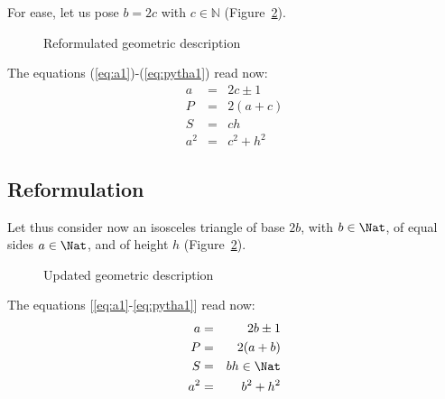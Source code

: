 \documentclass[11pt, twoside, a4paper]{article}
\newcommand{\Figure}[1]{Figure~\ref{#1}}
\newcommand{\set}[1]{\mathbb{#1}}
\begin{document}
For ease, let us pose $b=2c$ with $c\in\set N$ (\Figure{fig:triangle2}). 
\begin{figure}
    \begin{center}
        \caption{Reformulated geometric description}
        \label{fig:triangle2}
    \end{center}
\end{figure}

The equations (\ref{eq:a1})-(\ref{eq:pytha1}) read now:
\begin{eqnarray}
a & = & 2c \pm 1 \\
P & = & 2(a+c) \\ 
S & = & ch \\
a^2 & = & c^2 + h^2 
\end{eqnarray}

    \subsection{Reformulation}
    Let thus consider now an isosceles triangle of base $2b$, with $b\in\Nat$, of equal sides $a\in\Nat$, and of height $h$ (\Figure{fig:triangle2}).
    
    \begin{figure}[h!]
        \begin{center}
            \caption{Updated geometric description}
            \label{fig:triangle2}
        \end{center}
    \end{figure}
    
    The equations [\ref{eq:a1}-\ref{eq:pytha1}] read now:
    \begin{eqnarray}
    a & = & 2b \pm 1 \\
    P & = & 2(a+b) \\ 
    S & = & bh \in \Nat\\
    a^2 & = & b^2 + h^2 
    \end{eqnarray} 
\end{document}
